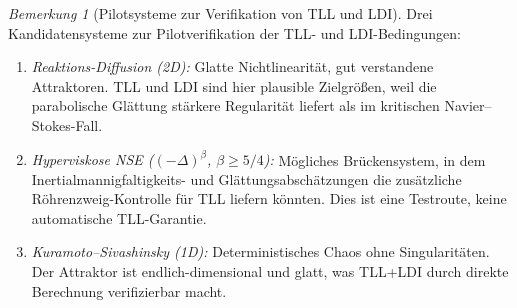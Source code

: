 \documentclass[12pt,a4paper]{article}
\theoremstyle{definition}
\theoremstyle{plain}
\theoremstyle{remark}
\newtheorem{remark}[definition]{Bemerkung}
\begin{document}
\begin{remark}[Pilotsysteme zur Verifikation von TLL und LDI]
\label{rem:pilot-verification}
Drei Kandidatensysteme zur Pilotverifikation der TLL- und LDI-Bedingungen:
\begin{enumerate}
\item \emph{Reaktions-Diffusion (2D):} Glatte Nichtlinearität, gut verstandene Attraktoren. TLL und LDI sind hier plausible Zielgrößen, weil die parabolische Glättung stärkere Regularität liefert als im kritischen Navier--Stokes-Fall.
\item \emph{Hyperviskose NSE ($(-\Delta)^\beta$, $\beta \geq 5/4$):} Mögliches Brückensystem, in dem Inertialmannigfaltigkeits- und Glättungsabschätzungen die zusätzliche Röhrenzweig-Kontrolle für TLL liefern könnten. Dies ist eine Testroute, keine automatische TLL-Garantie.
\item \emph{Kuramoto--Sivashinsky (1D):} Deterministisches Chaos ohne Singularitäten. Der Attraktor ist endlich-dimensional und glatt, was TLL+LDI durch direkte Berechnung verifizierbar macht.
\end{enumerate}
\end{remark}
\end{document}
